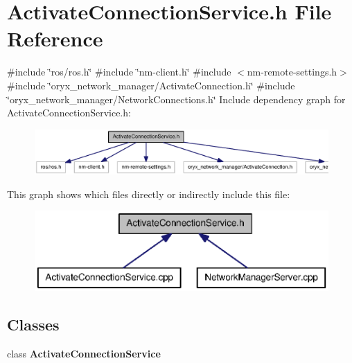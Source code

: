 \section{\-Activate\-Connection\-Service.\-h \-File \-Reference}
\label{ActivateConnectionService_8h}
{\ttfamily \#include \char`\"{}ros/ros.\-h\char`\"{}}\*
{\ttfamily \#include \char`\"{}nm-\/client.\-h\char`\"{}}\*
{\ttfamily \#include $<$nm-\/remote-\/settings.\-h$>$}\*
{\ttfamily \#include \char`\"{}oryx\-\_\-network\-\_\-manager/\-Activate\-Connection.\-h\char`\"{}}\*
{\ttfamily \#include \char`\"{}oryx\-\_\-network\-\_\-manager/\-Network\-Connections.\-h\char`\"{}}\*
\-Include dependency graph for \-Activate\-Connection\-Service.\-h\-:
\nopagebreak
\begin{figure}[H]
\begin{center}
\leavevmode
\includegraphics[width=350pt]{ActivateConnectionService_8h__incl}
\end{center}
\end{figure}
\-This graph shows which files directly or indirectly include this file\-:
\nopagebreak
\begin{figure}[H]
\begin{center}
\leavevmode
\includegraphics[width=350pt]{ActivateConnectionService_8h__dep__incl}
\end{center}
\end{figure}
\subsection*{\-Classes}
\begin{DoxyCompactItemize}
\item 
class {\bf \-Activate\-Connection\-Service}
\end{DoxyCompactItemize}
